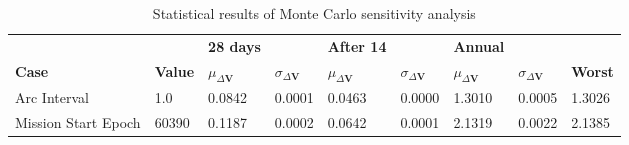 \begin{table}[h!]
\centering
\begin{tabular}{lllllllll}
 &  & \cellcolor[HTML]{EFEFEF}\textbf{28 days} &  & \cellcolor[HTML]{EFEFEF}\textbf{After 14} & & \cellcolor[HTML]{EFEFEF}\textbf{Annual} & &\\
\rowcolor[HTML]{EFEFEF} 
\textbf{Case} & \textbf{Value} & \textbf{$\mu_{\Delta \boldsymbol{V}}$} & \textbf{$\sigma_{\Delta \boldsymbol{V}}$} & \textbf{$\mu_{\Delta \boldsymbol{V}}$} & \textbf{$\sigma_{\Delta \boldsymbol{V}}$} & \textbf{$\mu_{\Delta \boldsymbol{V}}$} & \textbf{$\sigma_{\Delta \boldsymbol{V}}$} & \textbf{Worst} \\ 
Arc Interval & 1.0 & 0.0842 & 0.0001 & 0.0463 & 0.0000 & 1.3010 & 0.0005 & 1.3026 \\ 
Mission Start Epoch & 60390 & 0.1187 & 0.0002 & 0.0642 & 0.0001 & 2.1319 & 0.0022 & 2.1385 \\ 
\end{tabular}
\caption{Statistical results of Monte Carlo sensitivity analysis}
\label{tab:SensitivityAnalysis}
\end{table}